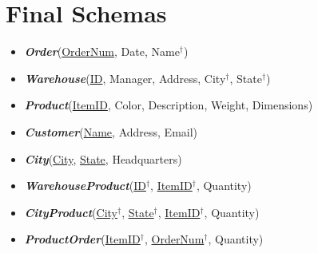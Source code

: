 \documentclass[letterpaper, 11pt]{article}
\newcommand{\1}{\mathds{1}}	%
\theoremstyle{definition}
\begin{document}
\section{Final Schemas}
\begin{itemize}
    \item[\ding{221}]\textit{\textbf{Order}}(\underline{OrderNum}, Date, Name$^\dag$)
    \item[\ding{221}] \textit{\textbf{Warehouse}}(\underline{ID}, Manager, Address, City$^\dag$, State$^\dag$)
    \item[\ding{221}] \textit{\textbf{Product}}(\underline{ItemID}, Color, Description, Weight, Dimensions)
    \item[\ding{221}] \textit{\textbf{Customer}}(\underline{Name}, Address, Email)
    \item[\ding{221}] \textit{\textbf{City}}(\underline{City}, \underline{State}, Headquarters)
    \item[\ding{221}] \textit{\textbf{WarehouseProduct}}(\underline{ID$^\dag$}, \underline{ItemID$^\dag$}, Quantity)
    \item[\ding{221}] \textit{\textbf{CityProduct}}(\underline{City$^\dag$}, \underline{State$^\dag$}, \underline{ItemID$^\dag$}, Quantity)
    \item[\ding{221}] \textit{\textbf{ProductOrder}}(\underline{ItemID$^\dag$}, \underline{OrderNum$^\dag$}, Quantity)
\end{itemize}
\end{document}
